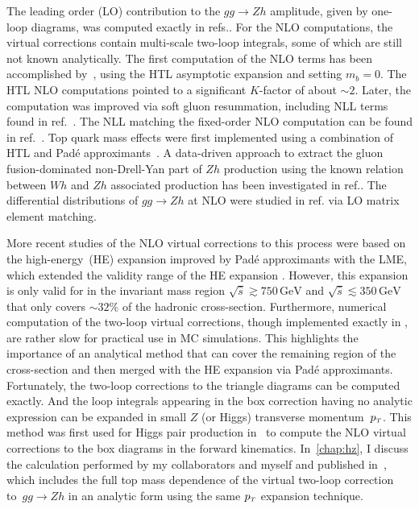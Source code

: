 \par The leading order (LO) contribution to the $g g \rightarrow Z h$ amplitude, given by one-loop diagrams, was computed exactly in refs.\cite{Kniehl:1990iva, Dicus:1988yh}. For the NLO computations, the virtual corrections contain multi-scale two-loop integrals, some of which are still not known analytically. The first computation of the NLO terms has been accomplished by~\cite{Altenkamp:2012sx}, using the HTL asymptotic expansion and setting $m_b = 0$. The HTL NLO computations pointed to a significant $K$-factor of about $\sim2$.  Later, the computation was improved via soft gluon resummation, including NLL terms found in ref.~\cite{Harlander:2014wda}. The NLL matching the fixed-order NLO computation can be found in ref.~\cite{Altenkamp:2012sx}.  Top quark mass effects were first implemented using a combination of  HTL and Pad\'e approximants~\cite{Hasselhuhn:2016rqt}. A data-driven approach to extract the gluon fusion-dominated non-Drell-Yan part of $Zh$ production using the known relation between  $Wh$
and $ Z h$ associated production has been investigated in ref.\cite{Harlander:2018yns}. The differential distributions of $g g \rightarrow Zh$  at NLO were studied in ref.\cite{Hespel:2015zea} via LO matrix element matching. 
\par More recent studies of the NLO virtual corrections to this process were based on the high-energy~(HE) expansion improved by Pad\'e approximants with the LME, which extended the validity range of the HE expansion \cite{Davies:2020drs}. However, this expansion is only valid for in the invariant mass region $\sqrt{\hat{s}}  \gtrsim 750\, \si{\GeV} $ and $\sqrt{\hat{s}}  \lesssim 350\,  \si{\GeV}$ that only covers $\sim 32\%$ of the hadronic cross-section. Furthermore, numerical computation of the two-loop virtual corrections, though implemented exactly in  \cite{Chen:2020gae}, are rather slow for practical use in MC simulations.  This highlights the importance of an analytical method that can cover the remaining region of the cross-section and then  merged with the HE expansion via Pad\'e approximants. Fortunately, the two-loop corrections to the triangle diagrams can be computed exactly. And the loop integrals appearing in the box correction having no analytic expression can be expanded in small  $Z$ (or Higgs) 
transverse momentum~$p_{\scriptscriptstyle T}$. This method was first used for Higgs pair production in~\cite{Bonciani:2018omm} to compute the NLO virtual corrections to the box diagrams in the forward kinematics. In~\autoref{chap:hz}, I discuss the calculation performed by my collaborators and myself and published in~\cite{Alasfar:2021ppe}, which includes the full top mass dependence of the virtual two-loop correction to~$ gg \to Zh$ in an analytic form using the same $p_{\scriptscriptstyle T}$ expansion technique.

